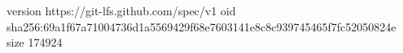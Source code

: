 version https://git-lfs.github.com/spec/v1
oid sha256:69a1f67a71004736d1a5569429f68e7603141e8c8c939745465f7fc52050824e
size 174924
